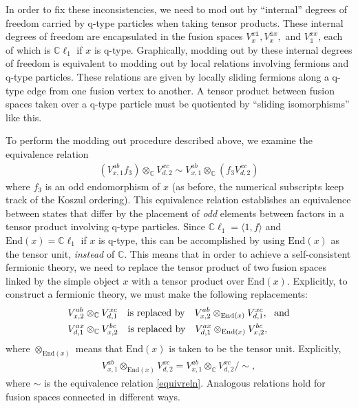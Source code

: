 \documentclass[12pt,a4paper]{article}
\newcommand{\tp}{\otimes}
\newcommand{\unit}{\mathds{1}}
\newcommand{\cc}{\mathbb{C}}
\newcommand\be            {\begin{equation}}
\newcommand\ee            {\end{equation}}
\newcommand\ba            {\begin{aligned}}
\newcommand\ea            {\end{aligned}}
\newcommand{\End}{\text{End}}
\newcommand{\cl}{\mathbb{C}\ell}
\begin{document}
In order to fix these inconsistencies, we need to mod out by ``internal'' degrees of freedom carried by q-type particles when taking tensor products. 
These internal degrees of freedom are encapsulated in the fusion spaces $V^{x\unit}_x, V^{\unit x}_x,$ and $V^{xx}_\unit$, each of which is $\cl_1$ if $x$ is q-type.
Graphically, modding out by these internal degrees of freedom is equivalent to modding out by local relations involving fermions and q-type particles.  
These relations are given by locally sliding fermions along a q-type edge from one fusion vertex to another.
A tensor product between fusion spaces taken over a q-type particle must be quotiented by ``sliding isomorphisms'' like this. 

To perform the modding out procedure described above, we examine the 
equivalence relation 
\begin{align} \label{equivreln}
(V^{ab}_{x,1} f_3) \tp_{\mathbb{C}}V^{xc}_{d,2} \sim V^{ab}_{x,1} \tp_{\mathbb{C}} (f_3 V^{xc}_{d,2})
\end{align}
where $f_3$ is an odd endomorphism of $x$ (as before, the numerical subscripts keep track of the Koszul ordering).
This equivalence relation establishes an equivalence between states that differ by the placement of {\it odd} elements between factors in a tensor product involving q-type particles. 
Since $\cl_1 = \langle1,f\rangle$ and $\End(x) = \cl_1$ if $x$ is q-type, this can be accomplished by using $\End(x)$ as the tensor unit, {\it instead} of $\cc$. 
This means that in order to achieve a self-consistent fermionic theory, we need to replace the tensor product of two fusion spaces linked by the simple object $x$ with a tensor product over $\End(x)$. 
 Explicitly, to construct a fermionic theory, we must make the following replacements:
\be \ba
 &V^{ab}_{x,2} \tp_{\mathbb{C}} V^{xc}_{d,1}\quad  \text{is replaced by} \quad V^{ab}_{x,2} \tp_{\text{End}(x)} V^{xc}_{d,1},\ \  {\rm and} \\ 
  &V^{ax}_{d,1} \tp_{\mathbb{C}} V^{bc}_{x,2}\quad  \text{is replaced by} \quad V^{ax}_{d,1} \tp_{\End(x)} V^{bc}_{x,2},
\ea 
\ee
where $\tp_{\End(x)}$ means that $\End(x)$ is taken to be the tensor unit. Explicitly, 
\begin{align}
V^{ab}_{x,1} \tp_{\text{End}(x)} V^{xc}_{d,2} = V^{ab}_{x,1} \tp_{\mathbb{C}}V^{xc}_{d,2}/ \sim,
\label{qtensor}
\end{align}
where $\sim$ is the equivalence relation \eqref{equivreln}. 
Analogous relations hold for fusion spaces connected in different ways. 
\end{document}

